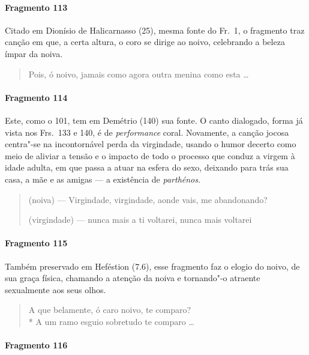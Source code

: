 \paragraph{Fragmento 113}

{\small Citado em Dionísio de Halicarnasso (25), mesma fonte do Fr.~1, o fragmento traz canção em que, a certa altura, o coro se dirige ao noivo, celebrando a beleza ímpar da noiva.}

\begin{verse}
Pois, ó noivo, jamais como agora outra \qb{}menina como esta \ldots{}
\end{verse}

\paragraph{Fragmento 114}

{\small Este, como o 101, tem em Demétrio (140) sua fonte. O canto dialogado, forma já vista
nos Frs.~133 e 140, é de \textit{performance} coral. Novamente, a canção jocosa
centra"-se na incontornável perda da virgindade, usando o humor decerto como
meio de aliviar a tensão e o impacto de todo o processo que conduz a virgem à
idade adulta, em que passa a atuar na esfera do sexo, deixando para trás sua casa, a mãe e as amigas --- a existência de \textit{parthénos}.}

\begin{verse}
(noiva) --- Virgindade, virgindade, aonde \qb{}vais, me abandonando?

(virgindade) --- nunca mais a ti voltarei, \qb{}nunca mais voltarei
\end{verse}

\paragraph{Fragmento 115}

{\small Também preservado em Heféstion (7.6), esse fragmento faz o elogio do noivo, de sua
graça física, chamando a atenção da noiva e tornando"-o atraente sexualmente aos
seus olhos. }

\begin{verse}
A que belamente, ó caro noivo, te comparo?\\*
A um ramo esguio sobretudo te comparo \ldots{}
\end{verse}

\paragraph{Fragmento 116}

